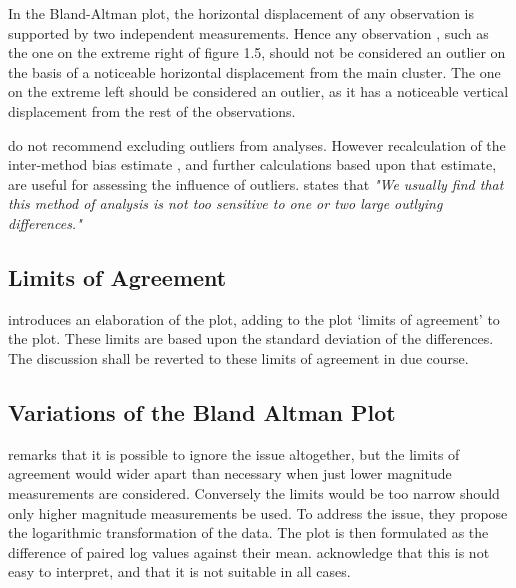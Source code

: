 \documentclass[12pt, a4paper]{report}
\theoremstyle{plain}
\theoremstyle{definition}
\theoremstyle{remark}
\begin{document}
	
	
	In the Bland-Altman plot, the horizontal displacement of any
	observation is supported by two independent measurements. Hence
	any observation , such as the one on the extreme right of figure
	1.5, should not be considered an outlier on the basis of a
	noticeable horizontal displacement from the main cluster. The one
	on the extreme left should be considered an outlier, as it has a
	noticeable vertical displacement from the rest of the
	observations.
	
	\citet*{BA99} do not recommend excluding outliers from analyses.
	However recalculation of the inter-method bias estimate , and
	further calculations based upon that estimate, are useful for
	assessing the influence of outliers.\citep{BA99} states that
	\emph{"We usually find that this method of analysis is not too
		sensitive to one or two large outlying differences."}
	
	\subsection{Limits of Agreement}
	\citet{BA86} introduces an elaboration of the plot, adding to the
	plot `limits of agreement' to the plot. These limits are based
	upon the standard deviation of the differences. The discussion
	shall be reverted to these limits of agreement in due course.
	
	\subsection{Variations of the Bland Altman Plot}
	\citet{BA99} remarks that it is possible to ignore the issue
	altogether, but the limits of agreement would wider apart than
	necessary when just lower magnitude measurements are considered.
	Conversely the limits would be too narrow should only higher
	magnitude measurements be used. To address the issue, they propose
	the logarithmic transformation of the data. The plot is then
	formulated as the difference of paired log values against their
	mean. \citet{BA99} acknowledge that this is not easy to interpret,
	and that it is not suitable in all cases.
	
\end{document}
